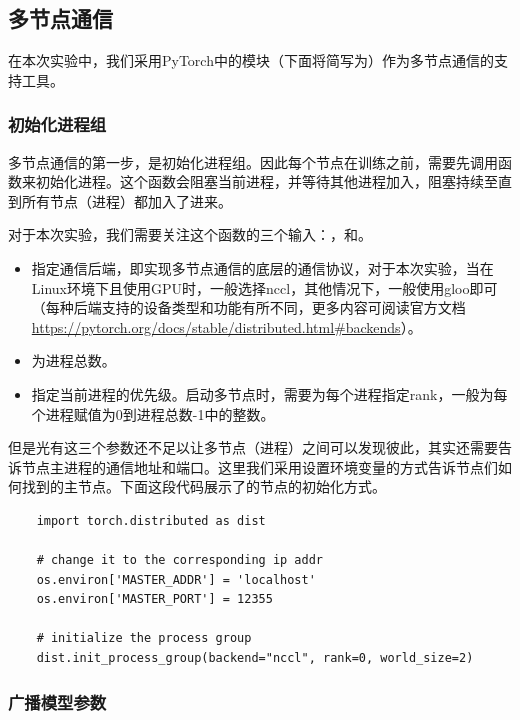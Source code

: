 \subsection{多节点通信}

在本次实验中，我们采用PyTorch中的模块（下面将简写为）作为多节点通信的支持工具。

\subsubsection{初始化进程组}\label{subsubsec:task2-init-process-group}

多节点通信的第一步，是初始化进程组。因此每个节点在训练之前，需要先调用函数来初始化进程。这个函数会阻塞当前进程，并等待其他进程加入，阻塞持续至直到所有节点（进程）都加入了进来。

对于本次实验，我们需要关注这个函数的三个输入：，和。
\begin{itemize}
    \item {}指定通信后端，即实现多节点通信的底层的通信协议，对于本次实验，当在Linux环境下且使用GPU时，一般选择nccl，其他情况下，一般使用gloo即可（每种后端支持的设备类型和功能有所不同，更多内容可阅读官方文档\url{https://pytorch.org/docs/stable/distributed.html#backends}）。
    \item {}为进程总数。
    \item {}指定当前进程的优先级。启动多节点时，需要为每个进程指定rank，一般为每个进程赋值为0到进程总数-1中的整数。
\end{itemize}

但是光有这三个参数还不足以让多节点（进程）之间可以发现彼此，其实还需要告诉节点主进程的通信地址和端口。这里我们采用设置环境变量的方式告诉节点们如何找到的主节点。下面这段代码展示了的节点的初始化方式。
\begin{lstlisting}
    import torch.distributed as dist

    # change it to the corresponding ip addr
    os.environ['MASTER_ADDR'] = 'localhost'
    os.environ['MASTER_PORT'] = 12355
    
    # initialize the process group
    dist.init_process_group(backend="nccl", rank=0, world_size=2)
\end{lstlisting}

\subsubsection{广播模型参数}

